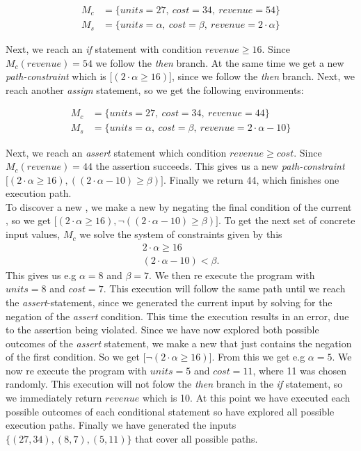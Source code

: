 \begin{align*}
	M_c & = \{units = 27, \ cost = 34, \ revenue = 54 \}\\
	M_s & = \{units = \alpha, \ cost = \beta, \ revenue = 2\cdot \alpha \}
\end{align*}

Next, we reach an \textsl{if} statement with condition $revenue \geq 16$. Since $M_c(revenue) = 54$ we follow the \textsl{then} branch. At the same time we get a new \emph{path-constraint} which is $\lbrack (2\cdot \alpha \geq 16) \rbrack$, since we follow the \textsl{then} branch. Next, we reach another \textsl{assign} statement, so we get the following environments:

\begin{align*}
	M_c & = \{units = 27, \ cost = 34, \ revenue = 44 \}\\
	M_s & = \{ units = \alpha, \ cost = \beta, \ revenue = 2 \cdot \alpha - 10 \}
\end{align*}

Next, we reach an \textsl{assert} statement which condition $revenue \geq cost$. Since $M_c(revenue) = 44$ the assertion succeeds. This gives us a new \emph{path-constraint} $\lbrack (2\cdot \alpha \geq 16) , ((2\cdot \alpha - 10) \geq \beta) \rbrack$. Finally we return 44, which finishes one execution path.\\
To discover a new \pc, we make a new \pc by negating the final condition of the current \pc, so we get $\lbrack (2\cdot \alpha \geq 16), \neg ((2\cdot \alpha - 10) \geq \beta) \rbrack$. To get the next set of concrete input values, $M_c$ we solve the system of constraints given by this \pc
\begin{align*}
	2\cdot \alpha \geq 16\\
	(2\cdot \alpha - 10) < \beta.
\end{align*}
This gives us e.g $\alpha = 8$ and $\beta = 7$. 
We then re execute the program with $units = 8$ and $cost = 7$. This execution will follow the same path until we reach the \textsl{assert}-statement, since we generated the current input by solving for the negation of the \textsl{assert} condition. This time the execution results in an error, due to the assertion being violated. Since we have now explored both possible outcomes of the \textsl{assert} statement, we make a new \pc that just contains the negation of the first condition. So we get $\lbrack \neg (2\cdot \alpha \geq 16) \rbrack$. From this we get e.g $\alpha = 5$. We now re execute the program with $units = 5$ and $cost = 11$, where 11 was chosen randomly. This execution will not folow the \textsl{then} branch in the \textsl{if} statement, so we immediately return $revenue$ which is 10. At this point we have executed each possible outcomes of each conditional statement so have explored all possible execution paths. Finally we have generated the inputs $\{(27, 34), (8,7), (5, 11)\}$ that cover all possible paths. 

